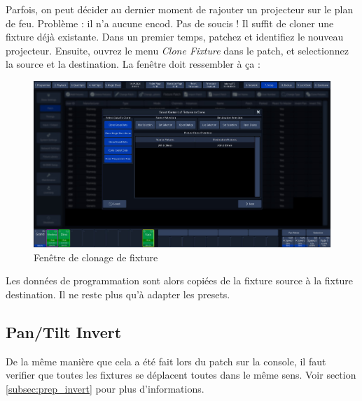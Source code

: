 Parfois, on peut décider au dernier moment de rajouter un projecteur sur le plan de feu. Problème : il n'a aucune encod.
\newline
Pas de soucis ! Il suffit de cloner une fixture déjà existante.
\newline
Dans un premier temps, patchez et identifiez le nouveau projecteur. Ensuite, ouvrez le menu \textit{Clone Fixture} dans le patch, et selectionnez la source et la destination.
La fenêtre doit ressembler à ça :
\begin{figure}[H]
    \centering
    \includegraphics[width=\textwidth]{4 - Adapter la programmation/Images/clone_fixture.jpg}
    \caption{Fenêtre de clonage de fixture}
\end{figure}
Les données de programmation sont alors copiées de la fixture source à la fixture destination. Il ne reste plus qu'à adapter les presets.

\subsection{Pan/Tilt Invert}
\label{subsec:invert_pan_tilt}

De la même manière que cela a été fait lors du patch sur la console, il faut verifier que toutes les fixtures se déplacent toutes dans le même sens.
\newline
Voir section \ref{subsec:prep_invert} pour plus d'informations.
